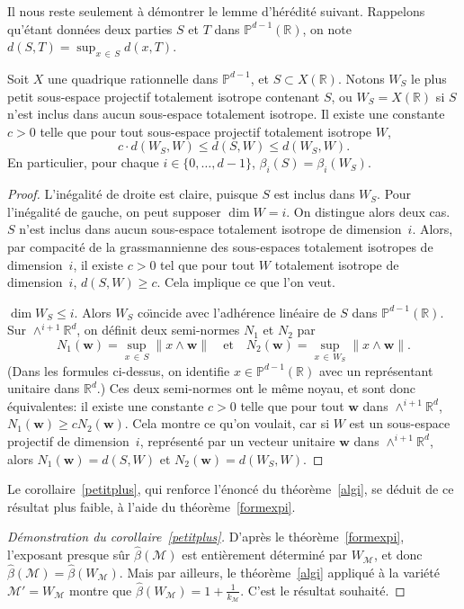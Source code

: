 \documentclass[AHL,Unicode,longabstracts,francais,published]{cedram}
\newcommand{\se}[2]{\{#1,\dots,#2\}}
\newcommand{\R}{\mathbb{R}}
\newcommand{\PP}{\mathbb{P}}
\newcommand{\bw}{\mathbf{w}}
\newcommand{\cM}{\mathcal{M}}
\newcommand{\bbeta}{\widehat{\beta}}
\begin{document}
Il nous reste seulement à démontrer le lemme d'hérédité suivant. Rappelons qu'étant données deux parties $S$ et $T$ dans $\PP^{d-1}(\R)$, on note $d(S,T)=\sup_{x\,\in\,S}d(x,T)$.

\begin{lemm}\label{her}
Soit $X$ une quadrique rationnelle dans $\PP^{d-1}$, et $S\subset X(\R)$. Notons $W_S$ le plus petit sous-espace projectif totalement isotrope contenant $S$, ou $W_S=X(\R)$ si $S$ n'est inclus dans aucun sous-espace totalement isotrope. Il existe une constante $c>0$ telle que pour tout sous-espace projectif totalement isotrope $W$,
\[
c\cdot d(W_S,W) \leq d(S,W) \leq d(W_S,W).
\]
En particulier, pour chaque $i\in\se{0}{d-1}$, $\beta_i(S)=\beta_i(W_S)$.
\end{lemm}


\begin{proof}
L'inégalité de droite est claire, puisque $S$ est inclus dans $W_S$. Pour l'inégalité de gauche, on peut supposer $\dim W=i$. On distingue alors deux cas.\\
 $S$ n'est inclus dans aucun sous-espace totalement isotrope de dimension~$i$. Alors, par compacité de la grassmannienne des sous-espaces totalement isotropes de dimension~$i$, il existe $c>0$ tel que pour tout $W$ totalement isotrope de dimension~$i$, $d(S,W)\geq c$. Cela implique ce que l'on veut.

 $\dim W_S\leq i$. Alors $W_S$ co{\"\i}ncide avec l'adhérence linéaire de $S$ dans $\PP^{d-1}(\R)$. Sur $\wedge^{i+1}\R^d$, on définit deux semi-normes $N_1$ et $N_2$ par
\[
N_1(\bw)=\sup_{x\,\in\,S} \|x\wedge\bw\| \quad\text{et}\quad N_2(\bw)=\sup_{x\,\in\,W_S}\|x\wedge\bw\|.
\]
(Dans les formules ci-dessus, on identifie $x\in\PP^{d-1}(\R)$ avec un représentant unitaire dans $\R^d$.) Ces deux semi-normes ont le même noyau, et sont donc équivalentes: il existe une constante $c>0$ telle que pour tout $\bw$ dans $\wedge^{i+1}\R^d$, $N_1(\bw)\geq cN_2(\bw)$. Cela montre ce qu'on voulait, car si $W$ est un sous-espace projectif de dimension~$i$, représenté par un vecteur unitaire $\bw$ dans $\wedge^{i+1}\R^d$, alors $N_1(\bw)=d(S,W)$ et $N_2(\bw)=d(W_S,W)$.
\end{proof}

Le corollaire~\ref{petitplus}, qui renforce l'énoncé du théorème~\ref{algi}, se déduit de ce résultat plus faible, à l'aide du théorème~\ref{formexpi}.

\begin{proof}[Démonstration du corollaire~\ref{petitplus}]
D'après le théorème~\ref{formexpi}, l'exposant presque sûr $\bbeta(\cM)$ est entièrement déterminé par $W_{\cM}$, et donc $\bbeta(\cM)=\bbeta(W_{\cM})$. Mais par ailleurs, le théorème~\ref{algi} appliqué à la variété $\cM'=W_{\cM}$ montre que $\bbeta(W_{\cM})=1+\frac{1}{k_{\cM}}$. C'est le résultat souhaité.
\end{proof}
\end{document}
